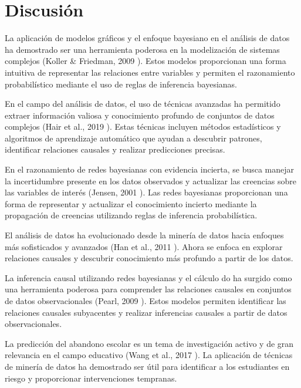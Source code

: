 \hypertarget{discusiuxf3n}{%
    \section{Discusión}\label{discusiuxf3n}}
    \vfill
La aplicación de modelos gráficos y el enfoque bayesiano en el análisis de datos ha demostrado ser una herramienta poderosa
en la modelización de sistemas complejos (Koller \& Friedman, 2009 \cite{koller2009introduction}). Estos modelos proporcionan
una forma intuitiva de representar las relaciones entre variables y permiten el razonamiento probabilístico mediante el uso de reglas de inferencia bayesianas.

En el campo del análisis de datos, el uso de técnicas avanzadas ha permitido extraer información valiosa y conocimiento profundo de conjuntos
de datos complejos (Hair et al., 2019 \cite{hair2019advanced}). Estas técnicas incluyen métodos estadísticos y algoritmos de aprendizaje
automático que ayudan a descubrir patrones, identificar relaciones causales y realizar predicciones precisas.

En el razonamiento de redes bayesianas con evidencia incierta, se busca manejar la incertidumbre presente en los datos observados y
actualizar las creencias sobre las variables de interés (Jensen, 2001 \cite{jensen2001bayesian}). Las redes bayesianas proporcionan
una forma de representar y actualizar el conocimiento incierto mediante la propagación de creencias utilizando reglas de inferencia probabilística.

El análisis de datos ha evolucionado desde la minería de datos hacia enfoques más sofisticados y avanzados (Han et al., 2011 \cite{han2011data}).
Ahora se enfoca en explorar relaciones causales y descubrir conocimiento más profundo a partir de los datos.

La inferencia causal utilizando redes bayesianas y el cálculo do ha surgido como una herramienta poderosa para comprender las relaciones
causales en conjuntos de datos observacionales (Pearl, 2009 \cite{pearl2009introduction}). Estos modelos permiten identificar las relaciones
causales subyacentes y realizar inferencias causales a partir de datos observacionales.

La predicción del abandono escolar es un tema de investigación activo y de gran relevancia en el campo educativo (Wang et al., 2017 \cite{wang2017literature}).
La aplicación de técnicas de minería de datos ha demostrado ser útil para identificar a los estudiantes en riesgo y proporcionar intervenciones tempranas.

